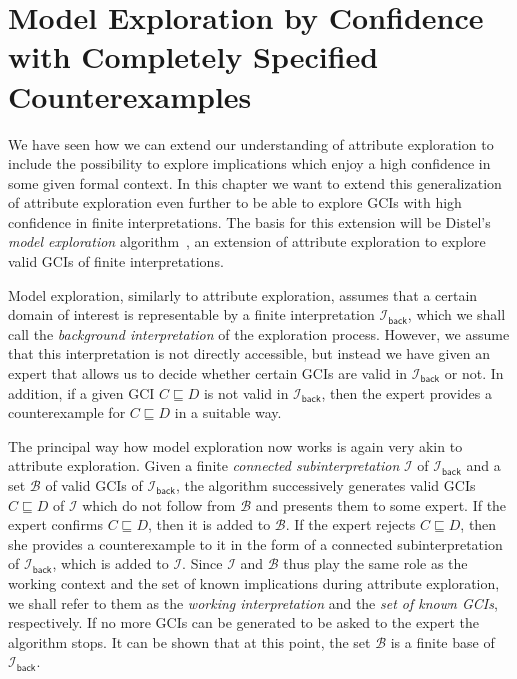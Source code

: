 \chapter[Model Exploration by Confidence]{Model Exploration by Confidence with Completely Specified Counterexamples}
\label{cha:model-expl-conf}

We have seen how we can extend our understanding of attribute exploration to include the
possibility to explore implications which enjoy a high confidence in some given formal
context.  In this chapter we want to extend this generalization of attribute exploration
even further to be able to explore GCIs with high confidence in finite interpretations.
The basis for this extension will be Distel's \emph{model exploration}
algorithm~\cite{Diss-Felix}, an extension of attribute exploration to explore valid GCIs
of finite interpretations.

Model exploration, similarly to attribute exploration, assumes that a certain domain of
interest is representable by a finite interpretation $\mathcal{I}_{\mathsf{back}}$, which
we shall call the \emph{background interpretation} of the exploration process.  However,
we assume that this interpretation is not directly accessible, but instead we have given
an expert that allows us to decide whether certain GCIs are valid in
$\mathcal{I}_{\mathsf{back}}$ or not.  In addition, if a given GCI $C \sqsubseteq D$ is
not valid in $\mathcal{I}_{\mathsf{back}}$, then the expert provides a counterexample for
$C \sqsubseteq D$ in a suitable way.

The principal way how model exploration now works is again very akin to attribute
exploration.  Given a finite \emph{connected subinterpretation} $\mathcal{I}$ of
$\mathcal{I}_{\mathsf{back}}$ and a set $\mathcal{B}$ of valid GCIs of
$\mathcal{I}_{\mathsf{back}}$, the algorithm successively generates valid GCIs $C
\sqsubseteq D$ of $\mathcal{I}$ which do not follow from $\mathcal{B}$ and presents them
to some expert.  If the expert confirms $C \sqsubseteq D$, then it is added to
$\mathcal{B}$.  If the expert rejects $C \sqsubseteq D$, then she provides a
counterexample to it in the form of a connected subinterpretation of
$\mathcal{I}_{\mathsf{back}}$, which is added to $\mathcal{I}$.  Since $\mathcal{I}$ and
$\mathcal{B}$ thus play the same role as the working context and the set of known
implications during attribute exploration, we shall refer to them as the \emph{working
  interpretation} and the \emph{set of known GCIs}, respectively.  If no more GCIs can be
generated to be asked to the expert the algorithm stops.  It can be shown that at this
point, the set $\mathcal{B}$ is a finite base of $\mathcal{I}_{\mathsf{back}}$.

